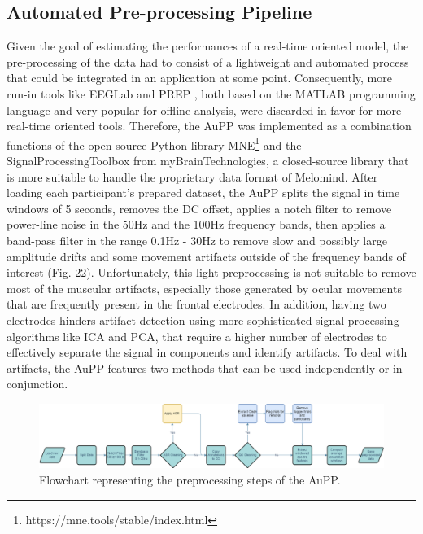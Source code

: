 \subsection{Automated Pre-processing Pipeline}
\label{sec:automated_pipeline}
Given the goal of estimating the performances of a real-time oriented model, the pre-processing of the data had to consist of a lightweight and automated process that could be integrated in an application at some point. Consequently, more run-in tools like EEGLab and PREP \cite{bigdely-shamlo_prep_2015}, both based on the MATLAB programming language and very popular for offline analysis, were discarded in favor for more real-time oriented tools. Therefore, the \ac{AuPP} was implemented as a combination functions of the open-source Python library MNE\footnote{https://mne.tools/stable/index.html}  and the SignalProcessingToolbox from myBrainTechnologies, a closed-source library that is more suitable to handle the proprietary data format of Melomind. After loading each participant’s prepared dataset, the \ac{AuPP} splits the signal in time windows of 5 seconds, removes the DC offset, applies a notch filter to remove power-line noise in the 50Hz and the 100Hz frequency bands, then applies a band-pass filter in the range 0.1Hz - 30Hz to remove slow and possibly large amplitude drifts and some movement artifacts outside of the frequency bands of interest (Fig. 22). Unfortunately, this light preprocessing is not suitable to remove most of the muscular artifacts, especially those generated by ocular movements that are frequently present in the frontal electrodes. In addition, having two electrodes hinders artifact detection using more sophisticated signal processing algorithms like \ac{ICA} and \ac{PCA}, that require a higher number of electrodes to effectively separate the signal in components and identify artifacts. To deal with artifacts, the \ac{AuPP} features two methods that can be used independently or in conjunction.

\begin{figure}[h!]
\includegraphics[width=15cm]{img/methods/preprocessing_pipeline.png}
\centering
\caption{Flowchart representing the preprocessing steps of the AuPP.} \label{fig_prep_pipeline}
\end{figure}

